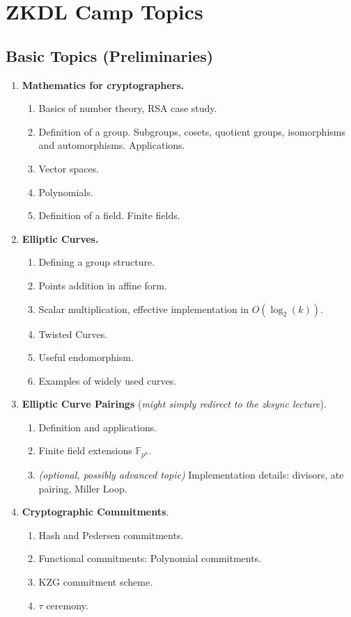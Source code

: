 \documentclass{zkdl-template}
\begin{document}
\section*{ZKDL Camp Topics}

\subsection*{Basic Topics (Preliminaries)}

\begin{enumerate}
    \item \textbf{Mathematics for cryptographers.}
    \begin{enumerate}
        \item Basics of number theory, RSA case study.
        \item Definition of a group. Subgroups, cosets, quotient groups, isomorphisms and automorphisms. Applications.
        \item Vector spaces.
        \item Polynomials.
        \item Definition of a field. Finite fields.
    \end{enumerate}
    \item \textbf{Elliptic Curves.}
    \begin{enumerate}
        \item Defining a group structure.
        \item Points addition in affine form.
        \item Scalar multiplication, effective implementation in $O(\log_2(k))$.
        \item Twisted Curves.
        \item Useful endomorphism.
        \item Examples of widely used curves.
    \end{enumerate}
    \item \textbf{Elliptic Curve Pairings} (\textit{might simply redirect to the zksync lecture}).
    \begin{enumerate}
        \item Definition and applications.
        \item Finite field extensions $\mathbb{F}_{p^n}$.
        \item \textit{(optional, possibly advanced topic)} Implementation details: divisors, ate pairing, Miller Loop.
    \end{enumerate}
    \item \textbf{Cryptographic Commitments}.
    \begin{enumerate}
        \item Hash and Pedersen commitments.
        \item Functional commitments: Polynomial commitments.
        \item KZG commitment scheme.
        \item $\tau$ ceremony.
    \end{enumerate}
\end{enumerate}
\end{document}
